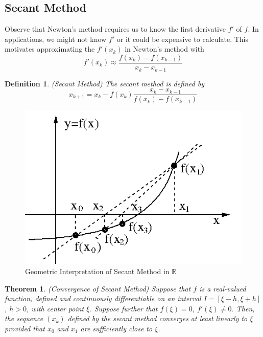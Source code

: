 \documentclass[12pt]{article}
\newtheorem{theorem}{Theorem}
\newtheorem{definition}{Definition}
\theoremstyle{definition}
\newcommand{\R}{\mathbb{R}}
\begin{document}
\subsection{Secant Method}
Observe that Newton's method requires us to know the first derivative $f'$ of $f$. In applications, we might not know $f'$ or it could be expensive to calculate. This motivates approximating the $f'(x_k)$ in Newton's method with
\begin{equation}
	f'(x_k) \approx \frac{f(x_k) - f(x_{k-1})}{x_k - x_{k-1}}
\end{equation}

\begin{definition}(Secant Method)
The secant method is defined by 
\begin{equation}
	x_{k+1} = x_k - f(x_k) \frac{x_k - x_{k-1}}{f(x_k) - f(x_{k-1})}
\end{equation}
\end{definition}

\begin{figure}[H]
	\begin{center}
		\includegraphics[scale=.5]{secant_method.png}
	\end{center}
	\caption{Geometric Interpretation of Secant Method in $\R$}
\end{figure}

\begin{theorem}(Convergence of Secant Method)
Suppose that $f$ is a real-valued function, defined and continuously differentiable on an interval $I = [\xi - h, \xi + h]$, $h > 0$, with center point $\xi$. Suppose further that $f(\xi) = 0$, $f'(\xi) \neq 0$. Then, the sequence $(x_k)$ defined by the secant method converges at least linearly to $\xi$ provided that $x_0$ and $x_1$ are sufficiently close to $\xi$. 
\end{theorem}
\end{document}
